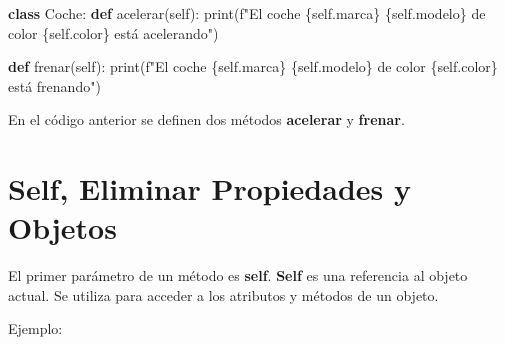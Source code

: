\documentclass[
  a4paper,
  DIV=11,
  numbers=noendperiod,
  onepage,
  openany]{scrreprt}
\newenvironment{Shaded}{\begin{snugshade}}{\end{snugshade}}
\newcommand{\BuiltInTok}[1]{\textcolor[rgb]{0.00,0.23,0.31}{#1}}
\newcommand{\KeywordTok}[1]{\textcolor[rgb]{0.00,0.23,0.31}{\textbf{#1}}}
\newcommand{\NormalTok}[1]{\textcolor[rgb]{0.00,0.23,0.31}{#1}}
\newcommand{\SpecialCharTok}[1]{\textcolor[rgb]{0.37,0.37,0.37}{#1}}
\newcommand{\SpecialStringTok}[1]{\textcolor[rgb]{0.13,0.47,0.30}{#1}}
\newcommand{\VariableTok}[1]{\textcolor[rgb]{0.07,0.07,0.07}{#1}}
\begin{document}
\begin{Shaded}
\begin{Highlighting}[]
\KeywordTok{class}\NormalTok{ Coche:}
    \KeywordTok{def}\NormalTok{ acelerar(}\VariableTok{self}\NormalTok{):}
        \BuiltInTok{print}\NormalTok{(}\SpecialStringTok{f"El coche }\SpecialCharTok{\{}\VariableTok{self}\SpecialCharTok{.}\NormalTok{marca}\SpecialCharTok{\}}\SpecialStringTok{ }\SpecialCharTok{\{}\VariableTok{self}\SpecialCharTok{.}\NormalTok{modelo}\SpecialCharTok{\}}\SpecialStringTok{ de color }\SpecialCharTok{\{}\VariableTok{self}\SpecialCharTok{.}\NormalTok{color}\SpecialCharTok{\}}\SpecialStringTok{ está acelerando"}\NormalTok{)}

    \KeywordTok{def}\NormalTok{ frenar(}\VariableTok{self}\NormalTok{):}
        \BuiltInTok{print}\NormalTok{(}\SpecialStringTok{f"El coche }\SpecialCharTok{\{}\VariableTok{self}\SpecialCharTok{.}\NormalTok{marca}\SpecialCharTok{\}}\SpecialStringTok{ }\SpecialCharTok{\{}\VariableTok{self}\SpecialCharTok{.}\NormalTok{modelo}\SpecialCharTok{\}}\SpecialStringTok{ de color }\SpecialCharTok{\{}\VariableTok{self}\SpecialCharTok{.}\NormalTok{color}\SpecialCharTok{\}}\SpecialStringTok{ está frenando"}\NormalTok{)}
\end{Highlighting}
\end{Shaded}

En el código anterior se definen dos métodos \textbf{acelerar} y
\textbf{frenar}.

\section{Self, Eliminar Propiedades y
Objetos}\label{self-eliminar-propiedades-y-objetos}

El primer parámetro de un método es \textbf{self}. \textbf{Self} es una
referencia al objeto actual. Se utiliza para acceder a los atributos y
métodos de un objeto.

Ejemplo:
\end{document}
